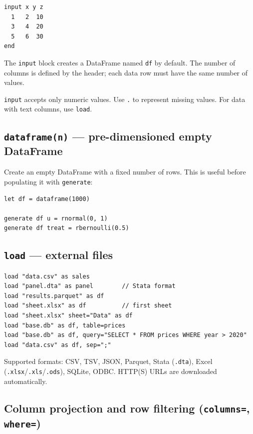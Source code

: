 \begin{lstlisting}[caption={input block}]
input x y z
  1   2  10
  3   4  20
  5   6  30
end
\end{lstlisting}

The \lstinline{input} block creates a DataFrame named \lstinline{df} by
default. The number of columns is defined by the header; each data row
must have the same number of values.

\begin{nota}
  \lstinline{input} accepts only numeric values. Use \lstinline{.} to
  represent missing values. For data with text columns, use
  \lstinline{load}.
\end{nota}

\subsection*{\texttt{dataframe(n)} — pre-dimensioned empty DataFrame}

Create an empty DataFrame with a fixed number of rows. This is useful
before populating it with \lstinline{generate}:

\begin{lstlisting}[caption={Pre-dimensioned DataFrame}]
let df = dataframe(1000)

generate df u = rnormal(0, 1)
generate df treat = rbernoulli(0.5)
\end{lstlisting}

\subsection*{\texttt{load} — external files}

\begin{lstlisting}[caption={Loading files}]
load "data.csv" as sales
load "panel.dta" as panel        // Stata format
load "results.parquet" as df
load "sheet.xlsx" as df          // first sheet
load "sheet.xlsx" sheet="Data" as df
load "base.db" as df, table=prices
load "base.db" as df, query="SELECT * FROM prices WHERE year > 2020"
load "data.csv" as df, sep=";"
\end{lstlisting}

Supported formats: CSV, TSV, JSON, Parquet, Stata (\texttt{.dta}),
Excel (\texttt{.xlsx}/\texttt{.xls}/\texttt{.ods}), SQLite, ODBC. HTTP(S) URLs
are downloaded automatically.

\subsection*{Column projection and row filtering (\texttt{columns=}, \texttt{where=})}

